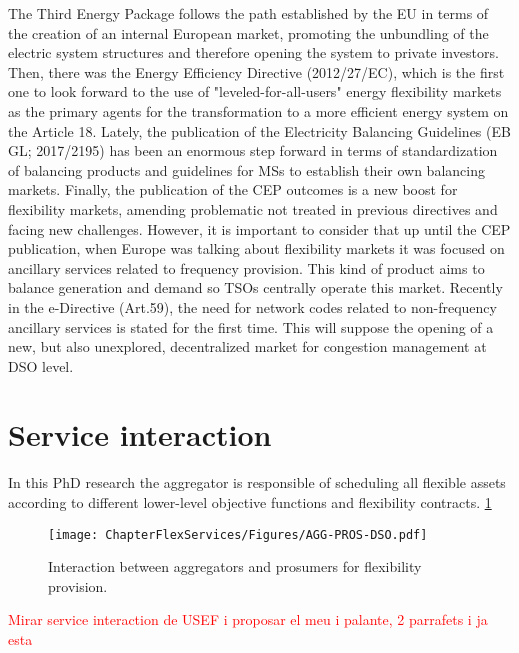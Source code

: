 The Third Energy Package follows the path established by the EU in terms of the creation of an internal European market, promoting the unbundling of the electric system structures and therefore opening the system to private investors. Then, there was the Energy Efficiency Directive (2012/27/EC), which is the first one to look forward to the use of "leveled-for-all-users" energy flexibility markets as the primary agents for the transformation to a more efficient energy system on the Article 18. Lately, the publication of the Electricity Balancing Guidelines (EB GL; 2017/2195) has been an enormous step forward in terms of standardization of balancing products and guidelines for MSs to establish their own balancing markets. Finally, the publication of the CEP outcomes is a new boost for flexibility markets, amending problematic not treated in previous directives and facing new challenges.  
However, it is important to consider that up until the CEP publication, when Europe was talking about flexibility markets it was focused on ancillary services related to frequency provision. This kind of product aims to balance generation and demand so TSOs centrally operate this market. Recently in the e-Directive (Art.59), the need for network codes related to non-frequency ancillary services is stated for the first time. This will suppose the opening of a new, but also unexplored, decentralized market for congestion management at DSO level.


\section{Service interaction}
In this PhD research the aggregator is responsible of scheduling all flexible assets according to different lower-level objective functions and flexibility contracts. \ref{fig:agg-pros-dso} 

\begin{figure}[htbp]
	\centering
	\texttt{[image: ChapterFlexServices/Figures/AGG-PROS-DSO.pdf]}
		\caption{Interaction between aggregators and prosumers for flexibility provision.}
	\label{fig:agg-pros-dso}  
\end{figure}

\textcolor{red}{Mirar service interaction de USEF i proposar el meu i palante, 2 parrafets i ja esta}

